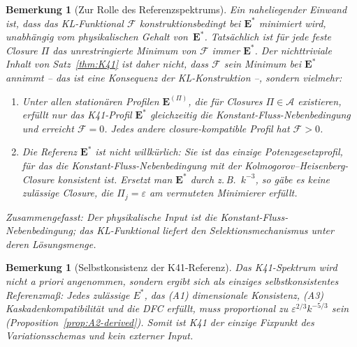 \documentclass[12pt,a4paper]{article}
\theoremstyle{breakdef}
\theoremstyle{breakplain}
\theoremstyle{breakdef}
\newtheorem{remark}[definition]{Bemerkung}
\begin{document}
\begin{remark}[Zur Rolle des Referenzspektrums]\label{rem:circularity}
Ein naheliegender Einwand ist, dass das KL-Funktional $\mathcal{F}$
\emph{konstruktionsbedingt} bei $\mathbf{E}^*$ minimiert wird, unabhängig
vom physikalischen Gehalt von~$\mathbf{E}^*$. Tatsächlich ist für jede
feste Closure $\Pi$ das unrestringierte Minimum von $\mathcal{F}$ immer
$\mathbf{E}^*$. Der nichttriviale Inhalt von Satz~\ref{thm:K41} ist
daher nicht, dass $\mathcal{F}$ sein Minimum bei $\mathbf{E}^*$ annimmt
-- das ist eine Konsequenz der KL-Konstruktion --, sondern vielmehr:
\begin{enumerate}
\item Unter allen stationären Profilen $\mathbf{E}^{(\Pi)}$, die für
  Closures $\Pi \in \mathscr{A}$ existieren, erfüllt nur das K41-Profil
  $\mathbf{E}^*$ \emph{gleichzeitig} die Konstant-Fluss-Nebenbedingung
  und erreicht $\mathcal{F} = 0$. Jedes andere closure-kompatible Profil
  hat $\mathcal{F} > 0$.
\item Die Referenz $\mathbf{E}^*$ ist nicht willkürlich: Sie ist das
  \emph{einzige} Potenzgesetzprofil, für das die Konstant-Fluss-Nebenbedingung
  mit der Kolmogorov--Heisenberg-Closure konsistent ist. Ersetzt man
  $\mathbf{E}^*$ durch z.\,B.\ $k^{-3}$, so gäbe es keine zulässige Closure,
  die $\Pi_j = \varepsilon$ am vermuteten Minimierer erfüllt.
\end{enumerate}
Zusammengefasst: Der physikalische Input ist die Konstant-Fluss-Nebenbedingung;
das KL-Funktional liefert den Selektionsmechanismus unter deren Lösungsmenge.
\end{remark}

\begin{remark}[Selbstkonsistenz der K41-Referenz]
\label{rem:k41-selfconsistency}
Das K41-Spektrum wird nicht \emph{a priori} angenommen, sondern ergibt sich als einziges selbstkonsistentes Referenzmaß: Jedes zulässige $E^*$, das (A1) dimensionale Konsistenz, (A3) Kaskadenkompatibilität und die DFC erfüllt, muss proportional zu $\varepsilon^{2/3} k^{-5/3}$ sein (Proposition~\ref{prop:A2-derived}). Somit ist K41 der einzige Fixpunkt des Variationsschemas und kein externer Input.
\end{remark}
\end{document}

